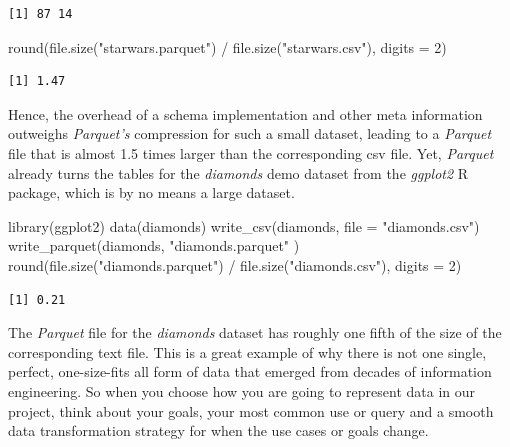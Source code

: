 \documentclass[
  12pt,
  letterpaper,
]{krantz}
\newenvironment{Shaded}{\begin{snugshade}}{\end{snugshade}}
\newcommand{\AttributeTok}[1]{\textcolor[rgb]{0.40,0.45,0.13}{#1}}
\newcommand{\DecValTok}[1]{\textcolor[rgb]{0.68,0.00,0.00}{#1}}
\newcommand{\FunctionTok}[1]{\textcolor[rgb]{0.28,0.35,0.67}{#1}}
\newcommand{\NormalTok}[1]{\textcolor[rgb]{0.00,0.23,0.31}{#1}}
\newcommand{\SpecialCharTok}[1]{\textcolor[rgb]{0.37,0.37,0.37}{#1}}
\newcommand{\StringTok}[1]{\textcolor[rgb]{0.13,0.47,0.30}{#1}}
\begin{document}
\begin{verbatim}
[1] 87 14
\end{verbatim}

\begin{Shaded}
\begin{Highlighting}[]
\FunctionTok{round}\NormalTok{(}\FunctionTok{file.size}\NormalTok{(}\StringTok{"starwars.parquet"}\NormalTok{) }\SpecialCharTok{/} 
      \FunctionTok{file.size}\NormalTok{(}\StringTok{"starwars.csv"}\NormalTok{),}
      \AttributeTok{digits =} \DecValTok{2}\NormalTok{)}
\end{Highlighting}
\end{Shaded}

\begin{verbatim}
[1] 1.47
\end{verbatim}

\normalsize

Hence, the overhead of a schema implementation and other meta
information outweighs \emph{Parquet's} compression for such a small
dataset, leading to a \emph{Parquet} file that is almost 1.5 times
larger than the corresponding csv file. Yet, \emph{Parquet} already
turns the tables for the \emph{diamonds} demo dataset from the
\emph{ggplot2} R package, which is by no means a large dataset.

\normalsize

\begin{Shaded}
\begin{Highlighting}[]
\FunctionTok{library}\NormalTok{(ggplot2)}
\FunctionTok{data}\NormalTok{(diamonds)}
\FunctionTok{write\_csv}\NormalTok{(diamonds, }\AttributeTok{file =} \StringTok{"diamonds.csv"}\NormalTok{)}
\FunctionTok{write\_parquet}\NormalTok{(diamonds, }\StringTok{"diamonds.parquet"}\NormalTok{ )}
\FunctionTok{round}\NormalTok{(}\FunctionTok{file.size}\NormalTok{(}\StringTok{"diamonds.parquet"}\NormalTok{) }\SpecialCharTok{/}
      \FunctionTok{file.size}\NormalTok{(}\StringTok{"diamonds.csv"}\NormalTok{),}
      \AttributeTok{digits =} \DecValTok{2}\NormalTok{)}
\end{Highlighting}
\end{Shaded}

\begin{verbatim}
[1] 0.21
\end{verbatim}

\normalsize

The \emph{Parquet} file for the \emph{diamonds} dataset has roughly one
fifth of the size of the corresponding text file. This is a great
example of why there is not one single, perfect, one-size-fits all form
of data that emerged from decades of information engineering. So when
you choose how you are going to represent data in our project, think
about your goals, your most common use or query and a smooth data
transformation strategy for when the use cases or goals change.
\end{document}
